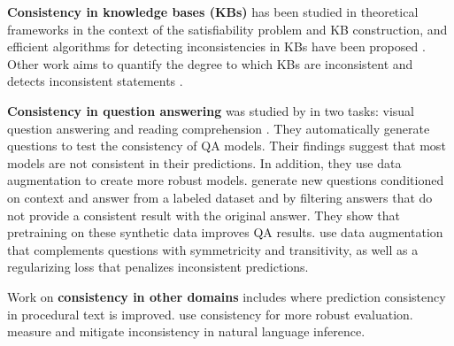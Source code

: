 \textbf{Consistency in knowledge bases (KBs)} has been
studied in theoretical frameworks in the context of the
satisfiability problem and KB construction, and efficient
algorithms for detecting inconsistencies in KBs have been
proposed \cite{hansen2000probabilistic,andersen2001easy}.
Other work aims to quantify the degree to which KBs are
inconsistent and detects inconsistent statements
\cite{Thimm:2009d,muino2011measuring,Thimm:2013}.



\textbf{Consistency in question answering} was studied by
\citet{ribeiro-etal-2019-red} in two tasks: visual question answering \cite{vqa} and reading comprehension \cite{squad}. They automatically generate questions to test the consistency of QA models.
Their findings suggest that most models are not consistent in their predictions. In addition, they use data augmentation to create more robust models.
\citet{alberti2019synthetic} generate new questions
conditioned on  context and answer from a labeled dataset
and by filtering answers that do not provide a consistent
result with the original answer. They show that pretraining on these synthetic data improves QA results.
\citet{consistent-qa}  use data augmentation that complements questions with symmetricity and transitivity, as well as a regularizing loss that penalizes inconsistent predictions.

Work on \textbf{consistency in other domains}
includes \citep{du2019consistent} where  prediction
consistency in procedural text is improved. \citet{ribeiro-etal-2020-beyond} use consistency for more robust evaluation. \citet{li-etal-2019-logic} measure and mitigate inconsistency in natural language inference.

